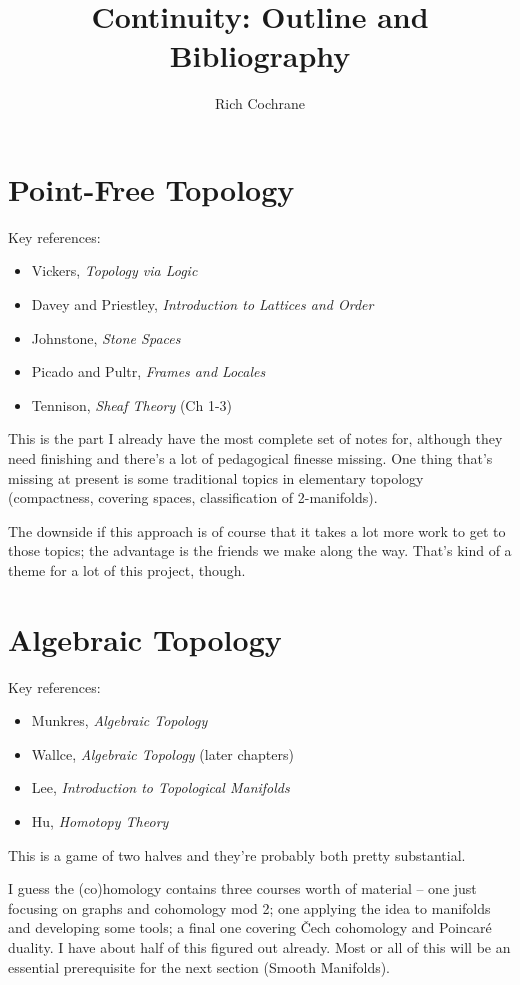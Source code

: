 \documentclass[article]{article}
\begin{document}
\title{Continuity: Outline and Bibliography}
\author{Rich Cochrane}
\maketitle

\section{Point-Free Topology}

Key references:
\begin{itemize}
	\item{Vickers, \emph{Topology via Logic}}
	\item{Davey and Priestley, \textit{Introduction to Lattices and Order}}
	\item{Johnstone, \emph{Stone Spaces}}
	\item{Picado and Pultr, \emph{Frames and Locales}}
	\item{Tennison, \emph{Sheaf Theory} (Ch 1-3)}
\end{itemize}

This is the part I already have the most complete set of notes for, although they need finishing and there's a lot of pedagogical finesse missing. One thing that's missing at present is some traditional topics in elementary topology (compactness, covering spaces, classification of 2-manifolds). 

The downside if this approach is of course that it takes a lot more work to get to those topics; the advantage is the friends we make along the way. That's kind of a theme for a lot of this project, though.

\section{Algebraic Topology}

Key references:
\begin{itemize}
	\item{Munkres, \textit{Algebraic Topology}}
	\item{Wallce, \textit{Algebraic Topology} (later chapters)}
	\item{Lee, \textit{Introduction to Topological Manifolds}}
	\item{Hu, \textit{Homotopy Theory}}
\end{itemize}

This is a game of two halves and they're probably both pretty substantial. 

I guess the (co)homology contains three courses worth of material -- one just focusing on graphs and cohomology mod 2; one applying the idea to manifolds and developing some tools; a final one covering \v{C}ech cohomology and Poincar\'e duality. I have about half of this figured out already. Most or all of this will be an essential prerequisite for the next section (Smooth Manifolds).
\end{document}
